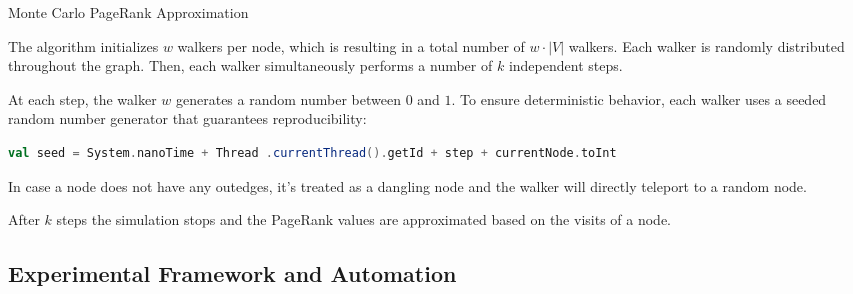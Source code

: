 \vspace{2.0em}
\begin{algorithm}[H]
\caption{Monte Carlo PageRank Approximation}

\end{algorithm}
\vspace{2.0em}

The algorithm initializes $w$ walkers per node, which is resulting in a total number of $w\cdot |V|$ walkers. Each walker is randomly distributed throughout the graph. Then, each walker simultaneously performs a number of $k$ independent steps. \par
At each step, the walker $w$ generates a random number between $0$ and $1$. To ensure deterministic behavior, each walker uses a seeded random number generator that guarantees reproducibility:
\vspace{0.5em}
\begin{lstlisting}[language=Scala, caption={Random Seed}, label={lst:randseed}]
    val seed = System.nanoTime + Thread .currentThread().getId + step + currentNode.toInt
\end{lstlisting}
\vspace{0.5em}
In case a node does not have any outedges, it's treated as a dangling node and the walker will directly teleport to a random node. \par
After $k$ steps the simulation stops and the PageRank values are approximated based on the visits of a node. 


\subsection{Experimental Framework and Automation}




 
